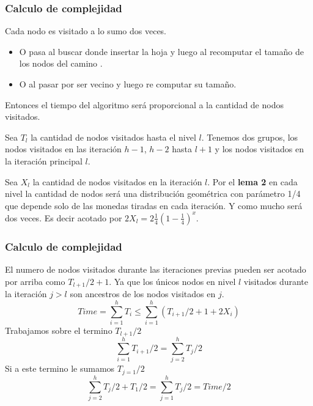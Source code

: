 \documentclass[10pt]{beamer}
\begin{document}
\begin{frame}
\frametitle{Calculo de complejidad}



Cada nodo es visitado a lo sumo dos veces.\pause
\begin{itemize}
  \item  O pasa al buscar donde insertar la hoja y luego al recomputar el tama\~no de los nodos del camino .
  \item O al pasar por ser vecino y luego re computar su tama\~no.
\end{itemize}

\pause
Entonces el tiempo del algoritmo será proporcional a la cantidad de nodos visitados.

\pause
Sea $T_l$ la cantidad de nodos visitados hasta el nivel $l$.
Tenemos dos grupos, los nodos  visitados en las iteración $h-1$, $h-2$ hasta $l+1$ y los nodos
visitados en la iteración principal $l$.

\pause
Sea $X_l$ la cantidad de nodos visitados en la iteración $l$.
Por el \textbf{lema 2} en cada nivel la cantidad de nodos será una distribución geométrica con parámetro 1/4 que
depende solo de las monedas tiradas en cada iteración.
Y como mucho será dos veces.
Es decir acotado por $2X_l=2 \frac{1}{4}(1-\frac{1}{4})^x$.

\end{frame}

\begin{frame}
\frametitle{Calculo de complejidad}

El numero de nodos visitados durante las iteraciones previas pueden ser acotado por arriba como $T_{l+1}/2 +1$.
Ya que los únicos  nodos en nivel $l$ visitados durante la iteración $j>l$ son ancestros de los nodos visitados en $j$.
\pause
\begin{equation*}
  Time = \sum_{i=1}^h T_i\leq \sum_{i=1}^h (T_{i+1}/2 +1 + 2X_i)
\end{equation*}
Trabajamos sobre el termino $T_{l+1}/2$
\pause
\begin{equation*}
  \sum_{i=1}^h T_{i+1}/2 = \sum_{j=2}^h T_j/2
\end{equation*}
Si a este termino le sumamos $T_{j=1}/2$
\pause
\begin{equation*}
  \sum_{j=2}^h T_j/2 + T_1/2 =  \sum_{j=1}^h T_{j}/2 = Time/2
\end{equation*}

\end{frame}
\end{document}
